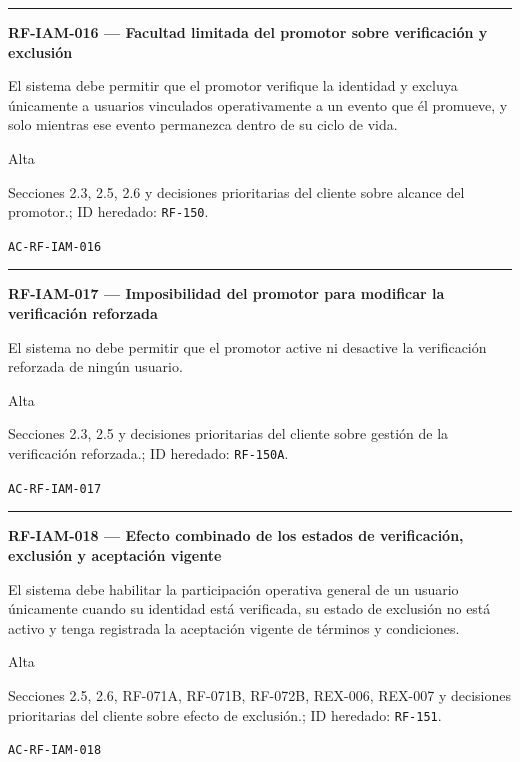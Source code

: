 \documentclass[10pt,letterpaper]{article}
\begin{document}
\vspace{0.25em}\hrule\vspace{0.65em}
\noindent\textbf{RF-IAM-016 --- Facultad limitada del promotor sobre verificación y exclusión}\par
\begin{description}[style=nextline,leftmargin=3.15cm,labelwidth=2.8cm,font=\normalfont\bfseries]
\item[Obligación] El sistema debe permitir que el promotor verifique la identidad y excluya únicamente a usuarios vinculados operativamente a un evento que él promueve, y solo mientras ese evento permanezca dentro de su ciclo de vida.
\item[Prioridad] Alta
\item[Procedencia] Secciones 2.3, 2.5, 2.6 y decisiones prioritarias del cliente sobre alcance del promotor.; ID heredado: \texttt{RF-150}.
\item[Verificación] \texttt{AC-RF-IAM-016}
\end{description}
\vspace{0.25em}\hrule\vspace{0.65em}
\noindent\textbf{RF-IAM-017 --- Imposibilidad del promotor para modificar la verificación reforzada}\par
\begin{description}[style=nextline,leftmargin=3.15cm,labelwidth=2.8cm,font=\normalfont\bfseries]
\item[Obligación] El sistema no debe permitir que el promotor active ni desactive la verificación reforzada de ningún usuario.
\item[Prioridad] Alta
\item[Procedencia] Secciones 2.3, 2.5 y decisiones prioritarias del cliente sobre gestión de la verificación reforzada.; ID heredado: \texttt{RF-150A}.
\item[Verificación] \texttt{AC-RF-IAM-017}
\end{description}
\vspace{0.25em}\hrule\vspace{0.65em}
\noindent\textbf{RF-IAM-018 --- Efecto combinado de los estados de verificación, exclusión y aceptación vigente}\par
\begin{description}[style=nextline,leftmargin=3.15cm,labelwidth=2.8cm,font=\normalfont\bfseries]
\item[Obligación] El sistema debe habilitar la participación operativa general de un usuario únicamente cuando su identidad está verificada, su estado de exclusión no está activo y tenga registrada la aceptación vigente de términos y condiciones.
\item[Prioridad] Alta
\item[Procedencia] Secciones 2.5, 2.6, RF-071A, RF-071B, RF-072B, REX-006, REX-007 y decisiones prioritarias del cliente sobre efecto de exclusión.; ID heredado: \texttt{RF-151}.
\item[Verificación] \texttt{AC-RF-IAM-018}
\end{description}
\end{document}

